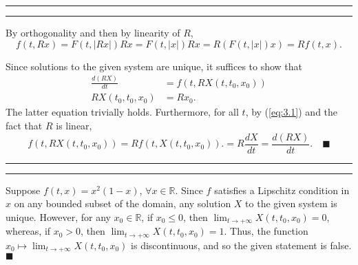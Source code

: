 \documentclass[11pt]{article}
\newcounter{questionCounter}
\newcounter{partCounter}[questionCounter]
\newenvironment{question}[2][\arabic{questionCounter}]{%
    \setcounter{partCounter}{0}%
    \vspace{.25in} \hrule \vspace{0.5em}%
        \noindent{\bf #2}%
    \vspace{0.8em} \hrule \vspace{.10in}%
    \addtocounter{questionCounter}{1}%
}{}
\renewcommand{\qed}{\quad $\blacksquare$}
\newcommand{\mqed}{\quad \blacksquare}
\newcommand{\R}{\mathbb{R}} %
\begin{document}
\begin{question}{Problem 3}
By orthogonality and then by linearity of $R$,
\begin{equation}
 f(t,Rx)
 = F(t,|Rx|)Rx
 = F(t,|x|)Rx
 = R(F(t,|x|)x)
 = R f(t,x).
\label{eq:3.1}
\end{equation}

Since solutions to the given system are unique, it suffices to show that
\begin{align*}
\frac{d(RX)}{dt} & = f(t,RX(t,t_0,x_0)) \\
RX(t_0,t_0,x_0) & = Rx_0.
\end{align*}
The latter equation trivially holds. Furthermore, for all $t$, by
(\ref{eq:3.1}) and the fact that $R$ is linear,
\[
  f(t,RX(t,t_0,x_0))
 = R f(t,X(t,t_0,x_0)).
 = R \frac{dX}{dt}
 = \frac{d(RX)}{dt}. \mqed
\]
\end{question}

\begin{question}{Problem 4}
Suppose $f(t,x) = x^2(1 - x)$, $\forall x \in \R$. Since $f$ satisfies a
Lipschitz condition in $x$ on any bounded subset of the domain, any solution
$X$ to the given system is unique. However, for any $x_0 \in \R$, if $x_0 \leq
0$, then $\lim_{t \rightarrow +\infty} X(t,t_0,x_0) = 0$, whereas, if $x_0 > 0$,
then $\lim_{t \rightarrow +\infty} X(t,t_0,x_0) = 1$. Thus, the function $x_0
\mapsto \lim_{t \rightarrow +\infty} X(t,t_0,x_0)$ is discontinuous, and so the
given statement is false. \qed
\end{question}
\end{document}
